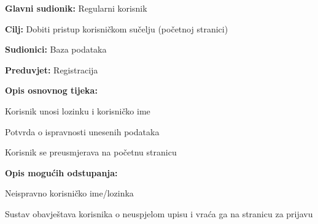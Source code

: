 					\noindent {}
					\begin{packed_item}
	
						\item \textbf{Glavni sudionik: }Regularni korisnik
						\item  \textbf{Cilj:} Dobiti pristup korisničkom sučelju (početnoj stranici)
						\item  \textbf{Sudionici:} Baza podataka
						\item  \textbf{Preduvjet:} Registracija
						\item  \textbf{Opis osnovnog tijeka:}
						
						\item[] \begin{packed_enum}
	
							\item Korisnik unosi lozinku i korisničko ime
							\item Potvrda o ispravnosti unesenih podataka
							\item Korisnik se preusmjerava na početnu stranicu

						\end{packed_enum}
						
						\item  \textbf{Opis mogućih odstupanja:}
						
						\item[] \begin{packed_item}
	
							\item[2.a] Neispravno korisničko ime/lozinka
							\item[] \begin{packed_enum}
								
								\item Sustav obavještava korisnika o neuspjelom upisu i vraća ga na stranicu za prijavu
								
							\end{packed_enum}
						\end{packed_item}
					\end{packed_item}
				
